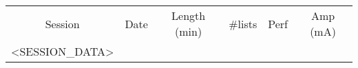 \begin{tabular}{|c|c|c|c|c|c|}
    \hline Session & Date & Length (min) & \#lists & Perf & Amp (mA) \\
    <SESSION_DATA>
\end{tabular}